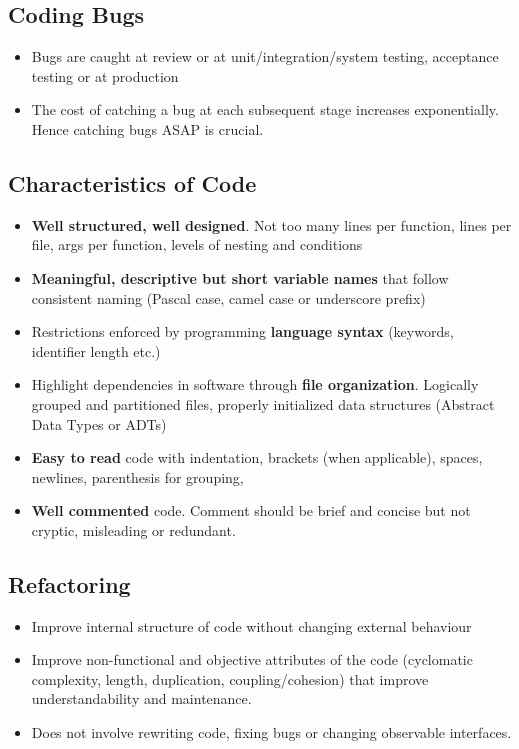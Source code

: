 \documentclass{article}
\begin{document}
\subsection{Coding Bugs}
\begin{itemize}
    \item Bugs are caught at review or at unit/integration/system testing, acceptance testing or at production
    
    \item The cost of catching a bug at each subsequent stage increases exponentially. Hence catching bugs ASAP is crucial.
\end{itemize}

\subsection{Characteristics of Code}
\begin{itemize}
    \item \textbf{Well structured, well designed}. Not too many lines per function, lines per file, args per function, levels of nesting and conditions
    
    \item \textbf{Meaningful, descriptive but short variable names} that follow consistent naming (Pascal case, camel case or underscore prefix)
    
    \item Restrictions enforced by programming \textbf{language syntax} (keywords, identifier length etc.)
    
    \item Highlight dependencies in software through \textbf{file organization}. Logically grouped and partitioned files, properly initialized data structures (Abstract Data Types or ADTs)
    
    \item \textbf{Easy to read} code with indentation, brackets (when applicable), spaces, newlines, parenthesis for grouping, 
    
    \item \textbf{Well commented} code. Comment should be brief and concise but not cryptic, misleading or redundant.
\end{itemize}

\subsection{Refactoring}
\begin{itemize}
    \item Improve internal structure of code without changing external behaviour
    
    \item Improve non-functional and objective attributes of the code (cyclomatic complexity, length, duplication, coupling/cohesion) that improve understandability and maintenance.
    
    \item Does not involve rewriting code, fixing bugs or changing observable interfaces. 
\end{itemize}
\end{document}
